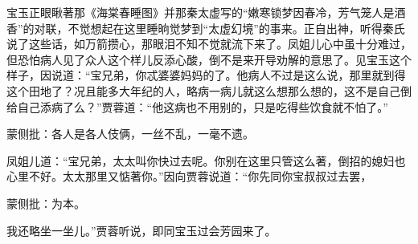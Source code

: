 \begin{parag}


    宝玉正眼瞅著那《海棠春睡图》并那秦太虚写的“嫩寒锁梦因春冷，芳气笼人是酒香”的对联，不觉想起在这里睡晌觉梦到“太虚幻境”的事来。正自出神，听得秦氏说了这些话，如万箭攒心，那眼泪不知不觉就流下来了。凤姐儿心中虽十分难过，但恐怕病人见了众人这个样儿反添心酸，倒不是来开导劝解的意思了。见宝玉这个样子，因说道：“宝兄弟，你忒婆婆妈妈的了。他病人不过是这么说，那里就到得这个田地了？况且能多大年纪的人，略病一病儿就这么想那么想的，这不是自己倒给自己添病了么？”贾蓉道：“他这病也不用别的，只是吃得些饮食就不怕了。”\begin{note}蒙侧批：各人是各人伎俩，一丝不乱，一毫不遗。\end{note}凤姐儿道：“宝兄弟，太太叫你快过去呢。你别在这里只管这么著，倒招的媳妇也心里不好。太太那里又惦著你。”因向贾蓉说道：“你先同你宝叔叔过去罢，\begin{note}蒙侧批：为本。\end{note}我还略坐一坐儿。”贾蓉听说，即同宝玉过会芳园来了。
\end{parag}


